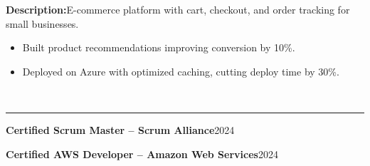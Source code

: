 \documentclass[letterpaper,11pt]{article}
\begin{document}
\textbf{Description:}\quad E-commerce platform with cart, checkout, and order tracking for small businesses.\\
\begin{itemize}
  \item Built product recommendations improving conversion by 10\%.
  \item Deployed on Azure with optimized caching, cutting deploy time by 30\%.
\end{itemize}
\par\vspace{3pt}
\par\vspace{6pt}
\par
{}\\
\vspace{2pt}\hrule\vspace{4pt}
\textbf{Certified Scrum Master -- Scrum Alliance}\hfill 2024\\
\par\vspace{2pt}
\textbf{Certified AWS Developer -- Amazon Web Services}\hfill 2024\\
\par\vspace{2pt}
\par\vspace{6pt}
\end{document}
